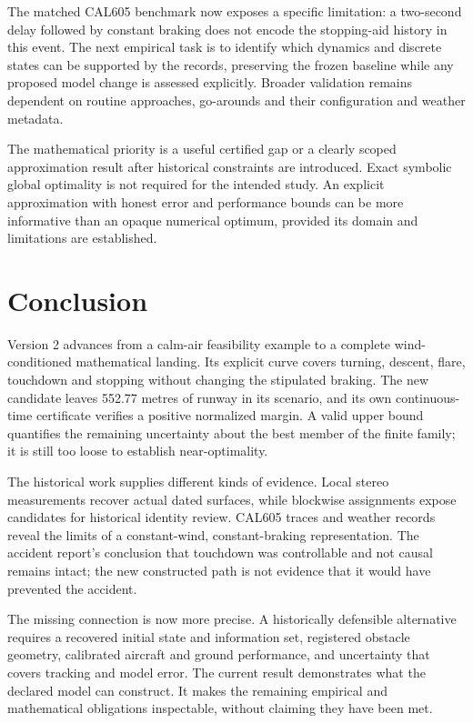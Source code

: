 The matched CAL605 benchmark now exposes a specific limitation: a two-second delay followed by constant braking does not encode the stopping-aid history in this event. The next empirical task is to identify which dynamics and discrete states can be supported by the records, preserving the frozen baseline while any proposed model change is assessed explicitly. Broader validation remains dependent on routine approaches, go-arounds and their configuration and weather metadata.

The mathematical priority is a useful certified gap or a clearly scoped approximation result after historical constraints are introduced. Exact symbolic global optimality is not required for the intended study. An explicit approximation with honest error and performance bounds can be more informative than an opaque numerical optimum, provided its domain and limitations are established.

\clearpage
\section{Conclusion}
Version 2 advances from a calm-air feasibility example to a complete wind-conditioned mathematical landing. Its explicit curve covers turning, descent, flare, touchdown and stopping without changing the stipulated braking. The new candidate leaves 552.77 metres of runway in its scenario, and its own continuous-time certificate verifies a positive normalized margin. A valid upper bound quantifies the remaining uncertainty about the best member of the finite family; it is still too loose to establish near-optimality.

The historical work supplies different kinds of evidence. Local stereo measurements recover actual dated surfaces, while blockwise assignments expose candidates for historical identity review. CAL605 traces and weather records reveal the limits of a constant-wind, constant-braking representation. The accident report's conclusion that touchdown was controllable and not causal remains intact; the new constructed path is not evidence that it would have prevented the accident.

The missing connection is now more precise. A historically defensible alternative requires a recovered initial state and information set, registered obstacle geometry, calibrated aircraft and ground performance, and uncertainty that covers tracking and model error. The current result demonstrates what the declared model can construct. It makes the remaining empirical and mathematical obligations inspectable, without claiming they have been met.
